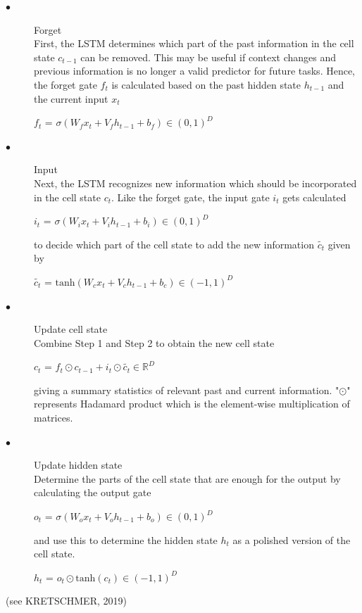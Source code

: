 \documentclass[a4paper,11pt,oneside]{book}
\begin{document}
\begin{description}
	\item[$\bullet$] Forget\\
	First, the LSTM determines which part of the past information in the cell state $c_{t-1}$ can be removed. This may be useful if context changes and previous information is no longer a valid predictor for future tasks. Hence, the forget gate $f_t$ is calculated based on the  past hidden state $h_{t-1}$ and the current input $x_t$
\begin{center}
	$f_t$ =  $\sigma(W_{f}x_{t}+V_{f}h_{t-1}+b_{f})\in (0,1)^{D}$
\end{center}
\item[$\bullet$] Input\\
Next, the LSTM recognizes new information which should be incorporated in the cell state $c_t$. Like the forget gate, the input gate $i_t$ gets calculated
\begin{center}
	$i_t$ =  $\sigma(W_{i}x_{t}+V_{i}h_{t-1}+b_{i})\in (0,1)^{D}$
\end{center}
to decide which part of the cell state to add the new information $\tilde{c_t}$ given by 
\begin{center}
	$\tilde{c_t}$ =  $\text{tanh}(W_{c}x_{t}+V_{c}h_{t-1}+b_{c})\in (-1,1)^{D}$
\end{center}

\item[$\bullet$] Update cell state\\
Combine Step 1 and Step 2 to obtain the new cell state

\begin{center}
	${c_t}$ =  $f_{t} \odot c_{t-1}+i_{t}\odot \tilde{c_t} \in \mathbb{R}^{D}$
\end{center}
giving a summary statistics of relevant past and current information. "$\odot$" represents Hadamard product which is the element-wise multiplication of matrices.

\item[$\bullet$] Update hidden state\\
Determine the parts of the cell state that are enough for the output by calculating
the output gate
\begin{center}
	$o_t$ =  $\sigma(W_{o}x_{t}+V_{o}h_{t-1}+b_{o})\in (0,1)^{D}$
\end{center}
and use this to determine the hidden state $h_t$ as a polished version of the cell state.

\begin{center}
	$h_t$ =  $o_t \odot \text{tanh}(c_t)\in (-1,1)^{D}$
\end{center}

\end{description}
(see KRETSCHMER, 2019)
\end{document}
